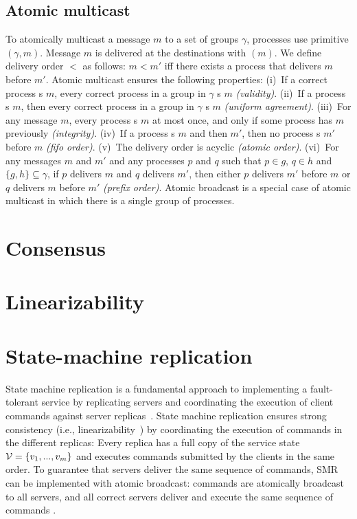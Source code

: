\subsection{Atomic multicast} \label{sec:amcast}

To atomically multicast a message $m$ to a set of groups $\gamma$, processes use
primitive \amcast$(\gamma, m)$.  Message $m$ is delivered at the destinations
with \amdel$(m)$.  We define delivery order $<$ as follows: $m < m'$ iff there
exists a process that delivers $m$ before $m'$. Atomic multicast ensures the
following properties: (i)~If a correct process \amcast{}s $m$, every correct
process in a group in $\gamma$ \amdel{}s $m$ \emph{(validity)}. (ii)~If a
process \amdel{}s $m$, then every correct process in a group in $\gamma$
\amdel{}s $m$ \emph{(uniform agreement)}. (iii)~For any message $m$, every
process \amdel{}s $m$ at most once, and only if some process has \amcast{} $m$
previously \emph{(integrity)}. (iv)~If a process \amcast{}s $m$ and then $m'$,
then no process \amdel{}s $m'$ before $m$ \emph{(fifo order)}. (v)~The delivery
order is acyclic \emph{(atomic order)}. (vi)~For any messages $m$ and $m'$ and
any processes $p$ and $q$ such that $p \in g$, $q \in h$ and $\{ g, h \}
\subseteq \gamma$, if $p$ delivers $m$ and $q$ delivers $m'$, then either $p$
delivers $m'$ before $m$ or $q$ delivers $m$ before $m'$ \emph{(prefix order)}.
Atomic broadcast is a special case of atomic multicast in which there is a
single group of processes.

\section{Consensus}
\lipsum[1-2]

\section{Linearizability}
\lipsum[1-2]

\section{State-machine replication}
\label{sec:smr}

State machine replication is a fundamental approach to implementing a
fault-tolerant service by replicating servers and coordinating the execution of
client commands against server replicas~\cite{Lam78,Sch90}. State machine
replication ensures strong consistency (i.e., linearizability~\cite{Attiya04})
by coordinating the execution of commands in the different replicas: Every
replica has a full copy of the service state $\mathcal{V} = \{v_1, ..., v_m\}$ and
executes commands submitted by the clients in the same order. To guarantee that
servers deliver the same sequence of commands, SMR can be implemented with
atomic broadcast: commands are atomically broadcast to all servers, and all
correct servers deliver and execute the same sequence of commands
\cite{BJ87b,DSU04}.
